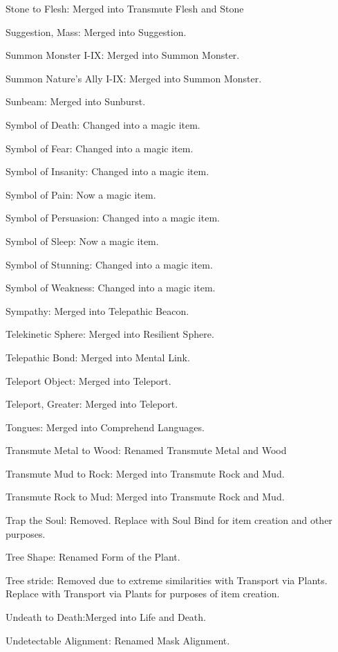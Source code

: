 {\begin{list}{}{\leftmargin=1em}
 \item Stone to Flesh: Merged into Transmute Flesh and Stone
 \item Suggestion, Mass: Merged into Suggestion.
 \item Summon Monster I-IX: Merged into Summon Monster.
 \item Summon Nature's Ally I-IX: Merged into Summon Monster.
 \item Sunbeam: Merged into Sunburst.
 \item Symbol of Death: Changed into a magic item.
 \item Symbol of Fear: Changed into a magic item.
 \item Symbol of Insanity: Changed into a magic item.
 \item Symbol of Pain: Now a magic item.
 \item Symbol of Persuasion: Changed into a magic item.
 \item Symbol of Sleep: Now a magic item.
 \item Symbol of Stunning: Changed into a magic item.
 \item Symbol of Weakness: Changed into a magic item.
 \item Sympathy: Merged into Telepathic Beacon.
 \item Telekinetic Sphere: Merged into Resilient Sphere.
 \item Telepathic Bond: Merged into Mental Link.
 \item Teleport Object: Merged into Teleport.
 \item Teleport, Greater: Merged into Teleport.
 \item Tongues: Merged into Comprehend Languages.
 \item Transmute Metal to Wood: Renamed Transmute Metal and Wood
 \item Transmute Mud to Rock: Merged into Transmute Rock and Mud.
 \item Transmute Rock to Mud: Merged into Transmute Rock and Mud.
 \item Trap the Soul: Removed. Replace with Soul Bind for item creation and other purposes.
 \item Tree Shape: Renamed Form of the Plant.
 \item Tree stride: Removed due to extreme similarities with Transport via Plants. Replace with Transport via Plants for purposes of item creation.
 \item Undeath to Death:Merged into Life and Death.
 \item Undetectable Alignment: Renamed Mask Alignment.

\end{list}}
